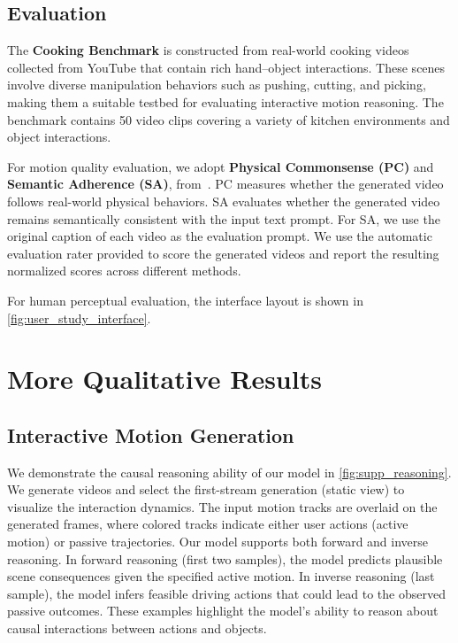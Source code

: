 


\subsection{Evaluation}

The \textbf{Cooking Benchmark} is constructed from real-world cooking videos collected from YouTube that contain rich hand–object interactions. These scenes involve diverse manipulation behaviors such as pushing, cutting, and picking, making them a suitable testbed for evaluating interactive motion reasoning. The benchmark contains 50 video clips covering a variety of kitchen environments and object interactions.

For motion quality evaluation, we adopt \textbf{Physical Commonsense (PC)} and \textbf{Semantic Adherence (SA)}, from~\cite{bansal2024videophy, bansal2025videophy}. PC measures whether the generated video follows real-world physical behaviors. SA evaluates whether the generated video remains semantically consistent with the input text prompt. For SA, we use the original caption of each video as the evaluation prompt. We use the automatic evaluation rater provided to score the generated videos and report the resulting normalized scores across different methods.

For human perceptual evaluation, the interface layout is shown in \cref{fig:user_study_interface}.









\section{More Qualitative Results}
\label{sec:more_qualitative}

\subsection{Interactive Motion Generation}
We demonstrate the causal reasoning ability of our model in \cref{fig:supp_reasoning}. We generate videos and select the first-stream generation (static view) to visualize the interaction dynamics. The input motion tracks are overlaid on the generated frames, where colored tracks indicate either user actions (active motion) or passive trajectories. Our model supports both forward and inverse reasoning. In forward reasoning (first two samples), the model predicts plausible scene consequences given the specified active motion. In inverse reasoning (last sample), the model infers feasible driving actions that could lead to the observed passive outcomes. These examples highlight the model's ability to reason about causal interactions between actions and objects.



